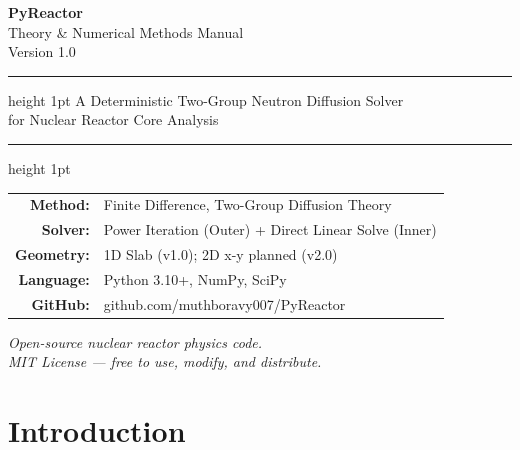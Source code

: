 \documentclass[12pt,a4paper]{article}
\begin{document}

\begin{titlepage}
  \centering
  \vspace*{2cm}

  {\Huge\bfseries\color{pyblue} PyReactor}\\[0.5cm]
  {\Large\color{pygray} Theory \& Numerical Methods Manual}\\[0.3cm]
  {\large\color{pygray} Version 1.0}

  \vspace{1.5cm}
  \hrule height 1pt
  \vspace{0.4cm}
  {\large A Deterministic Two-Group Neutron Diffusion Solver\\
   for Nuclear Reactor Core Analysis}
  \vspace{0.4cm}
  \hrule height 1pt

  \vspace{2cm}

  \begin{tabular}{rl}
    \textbf{Method:}   & Finite Difference, Two-Group Diffusion Theory \\[4pt]
    \textbf{Solver:}   & Power Iteration (Outer) + Direct Linear Solve (Inner) \\[4pt]
    \textbf{Geometry:} & 1D Slab (v1.0); 2D x-y planned (v2.0) \\[4pt]
    \textbf{Language:} & Python 3.10+, NumPy, SciPy \\[4pt]
    \textbf{GitHub:}   & github.com/muthboravy007/PyReactor \\
  \end{tabular}

  \vfill
  {\small\color{pygray}
    \textit{Open-source nuclear reactor physics code.}\\
    \textit{MIT License — free to use, modify, and distribute.}
  }
\end{titlepage}

\tableofcontents
\newpage

\section{Introduction}
\end{document}

